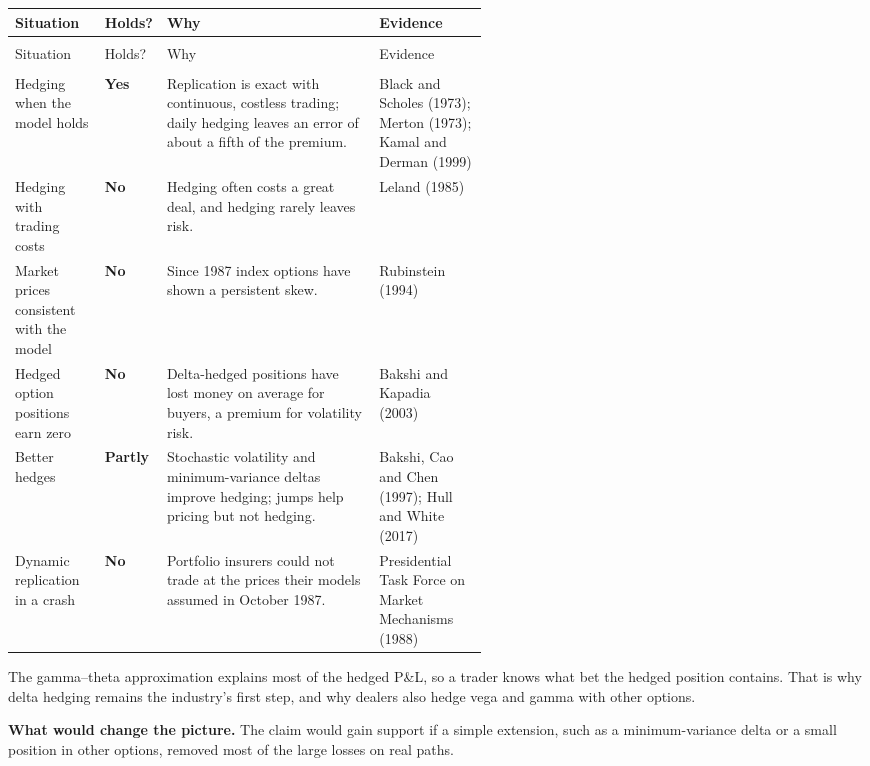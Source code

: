 {\small
\begin{longtable}{@{}>{\raggedright\arraybackslash}p{0.19\linewidth}>{\raggedright\arraybackslash}p{0.13\linewidth}>{\raggedright\arraybackslash}p{}>{\raggedright\arraybackslash}p{0.23\linewidth}@{}}
\toprule
Situation & Holds? & Why & Evidence \\
\midrule
\endfirsthead
\multicolumn{4}{@{}l}{\emph{(continued)}} \\
\toprule
Situation & Holds? & Why & Evidence \\
\midrule
\endhead
\midrule
\multicolumn{4}{r@{}}{\emph{(continued on the next page)}} \\
\endfoot
\bottomrule
\endlastfoot
Hedging when the model holds & \textbf{Yes} & Replication is exact with continuous, costless trading; daily hedging leaves an error of about a fifth of the premium. & Black and Scholes (1973); Merton (1973); Kamal and Derman (1999) \\*
\addlinespace[3pt]
Hedging with trading costs & \textbf{No} & Hedging often costs a great deal, and hedging rarely leaves risk. & Leland (1985) \\
\addlinespace[3pt]
Market prices consistent with the model & \textbf{No} & Since 1987 index options have shown a persistent skew. & Rubinstein (1994) \\
\addlinespace[3pt]
Hedged option positions earn zero & \textbf{No} & Delta-hedged positions have lost money on average for buyers, a premium for volatility risk. & Bakshi and Kapadia (2003) \\
\addlinespace[3pt]
Better hedges & \textbf{Partly} & Stochastic volatility and minimum-variance deltas improve hedging; jumps help pricing but not hedging. & Bakshi, Cao and Chen (1997); Hull and White (2017) \\*
\addlinespace[3pt]
Dynamic replication in a crash & \textbf{No} & Portfolio insurers could not trade at the prices their models assumed in October 1987. & Presidential Task Force on Market Mechanisms (1988) \\
\end{longtable}
\addtocounter{table}{-1}%
}

The gamma--theta approximation explains most of the hedged P\&L, so a trader knows what bet the hedged position contains. That is why delta hedging remains the industry's first step, and why dealers also hedge vega and gamma with other options.

\textbf{What would change the picture.} The claim would gain support if a simple extension, such as a minimum-variance delta or a small position in other options, removed most of the large losses on real paths.

